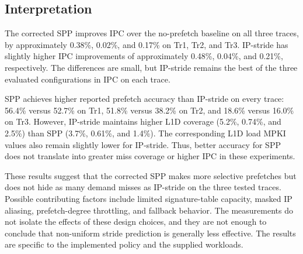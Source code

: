 
\subsection{Interpretation}

The corrected SPP improves IPC over the no-prefetch baseline on all three traces, by approximately 0.38\%, 0.02\%, and 0.17\% on Tr1, Tr2, and Tr3. IP-stride has slightly higher IPC improvements of approximately 0.48\%, 0.04\%, and 0.21\%, respectively. The differences are small, but IP-stride remains the best of the three evaluated configurations in IPC on each trace.

SPP achieves higher reported prefetch accuracy than IP-stride on every trace: 56.4\% versus 52.7\% on Tr1, 51.8\% versus 38.2\% on Tr2, and 18.6\% versus 16.0\% on Tr3. However, IP-stride maintains higher L1D coverage (5.2\%, 0.74\%, and 2.5\%) than SPP (3.7\%, 0.61\%, and 1.4\%). The corresponding L1D load MPKI values also remain slightly lower for IP-stride. Thus, better accuracy for SPP does not translate into greater miss coverage or higher IPC in these experiments.

These results suggest that the corrected SPP makes more selective prefetches but does not hide as many demand misses as IP-stride on the three tested traces. Possible contributing factors include limited signature-table capacity, masked IP aliasing, prefetch-degree throttling, and fallback behavior. The measurements do not isolate the effects of these design choices, and they are not enough to conclude that non-uniform stride prediction is generally less effective. The results are specific to the implemented policy and the supplied workloads.
